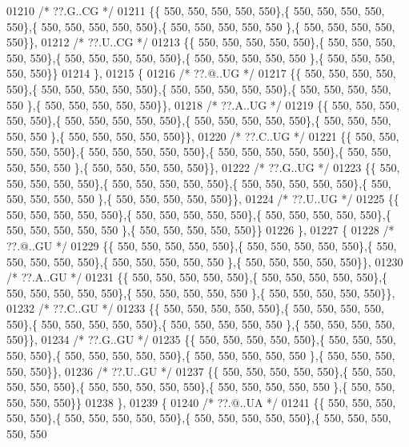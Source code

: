 \begin{DoxyCode}
01210 \textcolor{comment}{/* ??.G..CG */}
01211 \{\{ 550, 550, 550, 550, 550\},\{ 550, 550, 550, 550, 550\},\{ 550, 550, 550, 550, 550\},\{ 550, 550, 550, 550, 550
      \},\{ 550, 550, 550, 550, 550\}\},
01212 \textcolor{comment}{/* ??.U..CG */}
01213 \{\{ 550, 550, 550, 550, 550\},\{ 550, 550, 550, 550, 550\},\{ 550, 550, 550, 550, 550\},\{ 550, 550, 550, 550, 550
      \},\{ 550, 550, 550, 550, 550\}\}
01214 \},
01215 \{
01216 \textcolor{comment}{/* ??.@..UG */}
01217 \{\{ 550, 550, 550, 550, 550\},\{ 550, 550, 550, 550, 550\},\{ 550, 550, 550, 550, 550\},\{ 550, 550, 550, 550, 550
      \},\{ 550, 550, 550, 550, 550\}\},
01218 \textcolor{comment}{/* ??.A..UG */}
01219 \{\{ 550, 550, 550, 550, 550\},\{ 550, 550, 550, 550, 550\},\{ 550, 550, 550, 550, 550\},\{ 550, 550, 550, 550, 550
      \},\{ 550, 550, 550, 550, 550\}\},
01220 \textcolor{comment}{/* ??.C..UG */}
01221 \{\{ 550, 550, 550, 550, 550\},\{ 550, 550, 550, 550, 550\},\{ 550, 550, 550, 550, 550\},\{ 550, 550, 550, 550, 550
      \},\{ 550, 550, 550, 550, 550\}\},
01222 \textcolor{comment}{/* ??.G..UG */}
01223 \{\{ 550, 550, 550, 550, 550\},\{ 550, 550, 550, 550, 550\},\{ 550, 550, 550, 550, 550\},\{ 550, 550, 550, 550, 550
      \},\{ 550, 550, 550, 550, 550\}\},
01224 \textcolor{comment}{/* ??.U..UG */}
01225 \{\{ 550, 550, 550, 550, 550\},\{ 550, 550, 550, 550, 550\},\{ 550, 550, 550, 550, 550\},\{ 550, 550, 550, 550, 550
      \},\{ 550, 550, 550, 550, 550\}\}
01226 \},
01227 \{
01228 \textcolor{comment}{/* ??.@..GU */}
01229 \{\{ 550, 550, 550, 550, 550\},\{ 550, 550, 550, 550, 550\},\{ 550, 550, 550, 550, 550\},\{ 550, 550, 550, 550, 550
      \},\{ 550, 550, 550, 550, 550\}\},
01230 \textcolor{comment}{/* ??.A..GU */}
01231 \{\{ 550, 550, 550, 550, 550\},\{ 550, 550, 550, 550, 550\},\{ 550, 550, 550, 550, 550\},\{ 550, 550, 550, 550, 550
      \},\{ 550, 550, 550, 550, 550\}\},
01232 \textcolor{comment}{/* ??.C..GU */}
01233 \{\{ 550, 550, 550, 550, 550\},\{ 550, 550, 550, 550, 550\},\{ 550, 550, 550, 550, 550\},\{ 550, 550, 550, 550, 550
      \},\{ 550, 550, 550, 550, 550\}\},
01234 \textcolor{comment}{/* ??.G..GU */}
01235 \{\{ 550, 550, 550, 550, 550\},\{ 550, 550, 550, 550, 550\},\{ 550, 550, 550, 550, 550\},\{ 550, 550, 550, 550, 550
      \},\{ 550, 550, 550, 550, 550\}\},
01236 \textcolor{comment}{/* ??.U..GU */}
01237 \{\{ 550, 550, 550, 550, 550\},\{ 550, 550, 550, 550, 550\},\{ 550, 550, 550, 550, 550\},\{ 550, 550, 550, 550, 550
      \},\{ 550, 550, 550, 550, 550\}\}
01238 \},
01239 \{
01240 \textcolor{comment}{/* ??.@..UA */}
01241 \{\{ 550, 550, 550, 550, 550\},\{ 550, 550, 550, 550, 550\},\{ 550, 550, 550, 550, 550\},\{ 550, 550, 550, 550, 550

\end{DoxyCode}
